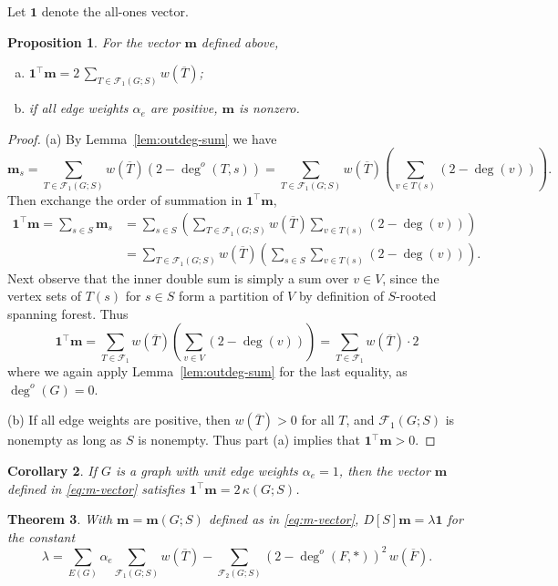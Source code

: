\documentclass{amsart}
\newtheorem{thm}{Theorem}
\newtheorem{prop}[thm]{Proposition}
\newtheorem{cor}[thm]{Corollary}
\theoremstyle{definition}
\newcommand{\bone}{\mathbf{1}}
\newcommand{\boldm}{\mathbf{m}}
\newcommand{\tr}{\intercal}
\newcommand{\trees}{\mathcal{F}_1}
\newcommand{\forests}{\mathcal{F}}
\newcommand{\degout}{\deg^o}
\begin{document}
Let $\bone$ denote the all-ones vector.
\begin{prop}
\label{prop:m-sum}
For the vector $\boldm$ defined above, 
\begin{enumerate}[(a)]
\item 
$\displaystyle \bone^\tr \boldm = 2 \,\sum_{T \in \trees(G;S)} w(\overline{T})$;

\item 
if all edge weights $\alpha_e$ are positive, $\boldm$ is nonzero.
\end{enumerate}
\end{prop}
\begin{proof}
(a)
By Lemma~\ref{lem:outdeg-sum} we have
\[
\boldm_s = \sum_{T \in \trees(G;S)} w(\overline{T}) (2 - \degout (T,s))
= \sum_{T \in \trees(G;S)} w(\overline{T}) \left( \sum_{v \in T(s)}(2 - \deg(v))\right).
\]
Then exchange the order of summation in $\bone^\tr \boldm$,
\begin{align}
	\bone^\tr \boldm = \sum_{s\in S} \boldm_s &= \sum_{s \in S} \left( \sum_{T \in \trees(G;S)} w(\overline{T}) \sum_{v \in T(s)}(2 - \deg(v)) \right) \\
	&= \sum_{T \in \trees(G;S)} w(\overline{T}) \left( \sum_{s\in S} \sum_{v \in T(s)} (2 - \deg(v)) \right) .
\end{align}
Next observe that the inner double sum is simply a sum over $v \in V$,
since the vertex sets of $T(s)$ for $s \in S$ form a partition of $V$ by definition of $S$-rooted spanning forest.
Thus 
\[
	\bone^\tr \boldm = \sum_{T \in \trees} w(\overline{T}) \left( \sum_{v \in V} (2 - \deg(v))\right)
	= \sum_{T \in \trees} w(\overline{T}) \cdot 2 
\]
where we again apply Lemma~\ref{lem:outdeg-sum} for the last equality, as $\degout(G) = 0$.

(b) 
If all edge weights are positive, then $w(\overline{T}) > 0$ for all $T$, and $\trees(G; S)$ is nonempty as long as $S$ is nonempty. 
Thus part (a) implies that $\bone^\tr \boldm > 0$.
\end{proof}

\begin{cor}
If $G$ is a graph with unit edge weights $\alpha_e = 1$, then the vector $\boldm$ defined in \eqref{eq:m-vector} satisfies $\bone^\tr \boldm = 2\, \kappa(G;S)$.
\end{cor}

\begin{thm}
\label{thm:m-distance-product}
With $\boldm = \boldm(G;S)$ defined as in \eqref{eq:m-vector},
$D[S] \boldm = \lambda \mathbf{1}$
for the constant
\begin{equation}
\label{eq:lambda}
	\lambda = \sum_{E(G)} \alpha_e \sum_{\trees(G;S)} w(\overline{T}) - \sum_{\forests_2(G;S)} (2 - \degout(F,*) )^2 \, w(\overline{F}) .
\end{equation}
\end{thm}
\end{document}
